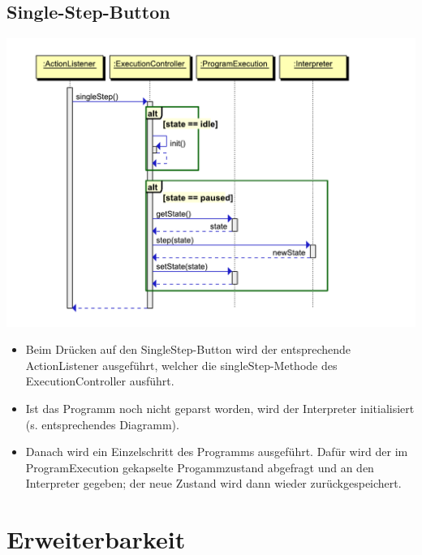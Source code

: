 \documentclass[10pt,a4paper,titlepage]{article}
\begin{document}
\subsection{Single-Step-Button}
\includegraphics[scale=0.9]{images/Button_Singlestep.pdf} \newline
\begin{itemize}
\item Beim Drücken auf den SingleStep-Button wird der entsprechende ActionListener ausgeführt, welcher die singleStep-Methode des ExecutionController ausführt.
\item Ist das Programm noch nicht geparst worden, wird der Interpreter initialisiert (s. entsprechendes Diagramm).
\item Danach wird ein Einzelschritt des Programms ausgeführt. Dafür wird der im ProgramExecution gekapselte Progammzustand abgefragt und an den Interpreter gegeben; der neue Zustand wird dann wieder zurückgespeichert.
\end{itemize}

\section{Erweiterbarkeit}

\end{document}
